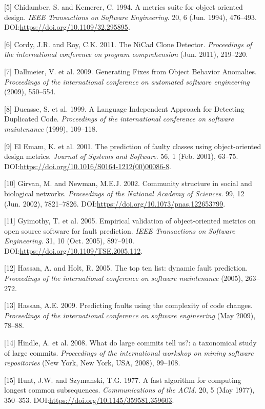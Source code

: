 \documentclass[sigconf]{acmart}
\begin{document}
[5] Chidamber, S. and Kemerer, C. 1994. A metrics suite for object
oriented design. \emph{IEEE Transactions on Software Engineering}. 20, 6
(Jun. 1994), 476--493. DOI:\url{https://doi.org/10.1109/32.295895}.


[6] Cordy, J.R. and Roy, C.K. 2011. The NiCad Clone Detector.
\emph{Proceedings of the international conference on program
comprehension} (Jun. 2011), 219--220.


[7] Dallmeier, V. et al. 2009. Generating Fixes from Object Behavior
Anomalies. \emph{Proceedings of the international conference on
automated software engineering} (2009), 550--554.


[8] Ducasse, S. et al. 1999. A Language Independent Approach for
Detecting Duplicated Code. \emph{Proceedings of the international
conference on software maintenance} (1999), 109--118.


[9] El Emam, K. et al. 2001. The prediction of faulty classes using
object-oriented design metrics. \emph{Journal of Systems and Software}.
56, 1 (Feb. 2001), 63--75.
DOI:\url{https://doi.org/10.1016/S0164-1212(00)00086-8}.


[10] Girvan, M. and Newman, M.E.J. 2002. Community structure in
social and biological networks. \emph{Proceedings of the National
Academy of Sciences}. 99, 12 (Jun. 2002), 7821--7826.
DOI:\url{https://doi.org/10.1073/pnas.122653799}.


[11] Gyimothy, T. et al. 2005. Empirical validation of
object-oriented metrics on open source software for fault prediction.
\emph{IEEE Transactions on Software Engineering}. 31, 10 (Oct. 2005),
897--910. DOI:\url{https://doi.org/10.1109/TSE.2005.112}.


[12] Hassan, A. and Holt, R. 2005. The top ten list: dynamic fault
prediction. \emph{Proceedings of the international conference on
software maintenance} (2005), 263--272.


[13] Hassan, A.E. 2009. Predicting faults using the complexity of
code changes. \emph{Proceedings of the international conference on
software engineering} (May 2009), 78--88.


[14] Hindle, A. et al. 2008. What do large commits tell us?: a
taxonomical study of large commits. \emph{Proceedings of the
international workshop on mining software repositories} (New York, New
York, USA, 2008), 99--108.


[15] Hunt, J.W. and Szymanski, T.G. 1977. A fast algorithm for
computing longest common subsequences. \emph{Communications of the ACM}.
20, 5 (May 1977), 350--353.
DOI:\url{https://doi.org/10.1145/359581.359603}.
\end{document}
